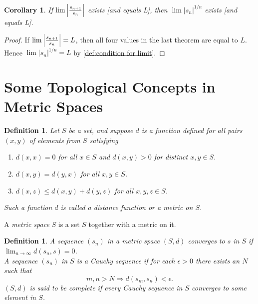 \documentclass[12pt, lettersize]{book}
\newtheorem{dfn}[thm]{Definition}
\newtheorem{cor}{Corollary}[thm]
\begin{document}
		\begin{cor}\label{def:12.3}
		If $\lim\abs{\frac{s_{n+1}}{s_n}}$ exists [and equals L], then $\lim|s_n|^{1/n}$ exists [and equals L].
		\end{cor}
		\begin{proof}
		If $\lim\abs{\frac{s_{n+1}}{s_n}}=L$, then all four values in the last theorem are equal to $L$. Hence
		$\lim|s_n|^{1/n}=L$ by \ref{def:condition for limit}.
		\end{proof}
		\newpage
	\section{Some Topological Concepts in Metric Spaces}
		\begin{dfn}
		Let $S$ be a set, and suppose $d$ is a function defined for all pairs $(x,y)$ of elements from $S$ satisfying
		\begin{enumerate}
			\item $d(x,x)=0$ for all $x\in S$ and $d(x,y)>0$ for distinct $x,y\in S$.
			\item $d(x,y)=d(y,x)$ for all $x,y\in S$.
			\item $d(x,z)\leq d(x,y)+d(y,z)$ for all $x,y,z\in S$.
		\end{enumerate}
		Such a function $d$ is called a \emph{distance function} or a \emph{metric} on $S$.
		\end{dfn}
		A \emph{metric space} $S$ is a set $S$ together with a metric on it.
		
		\begin{dfn}
		A sequence $(s_n)$ in a metric space $(S,d)$ converges to $s$ in $S$ if $\lim_{n\rightarrow\infty}d(s_n,s)=0$.\\ 
		A sequence $(s_n)$ in $S$ is a \emph{Cauchy sequence} if for each $\epsilon>0$ there exists an $N$ such that
		\begin{displaymath}
			m,n>N\Rightarrow d(s_m,s_n)<\epsilon.
		\end{displaymath}
		$(S,d)$ is said to be \emph{complete} if every Cauchy sequence in $S$ converges to some element in $S$.
		\end{dfn}
		
\end{document}
